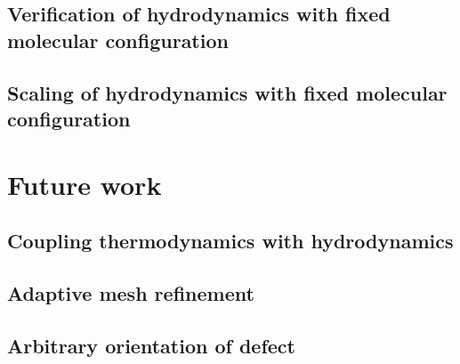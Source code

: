 \documentclass[reqno]{article}
\begin{document}
  \subsection{Verification of hydrodynamics with fixed molecular configuration}
  \subsection{Scaling of hydrodynamics with fixed molecular configuration}

  \section{Future work}
  \subsection{Coupling thermodynamics with hydrodynamics}
  \subsection{Adaptive mesh refinement}
  \subsection{Arbitrary orientation of defect}
	
\end{document}
